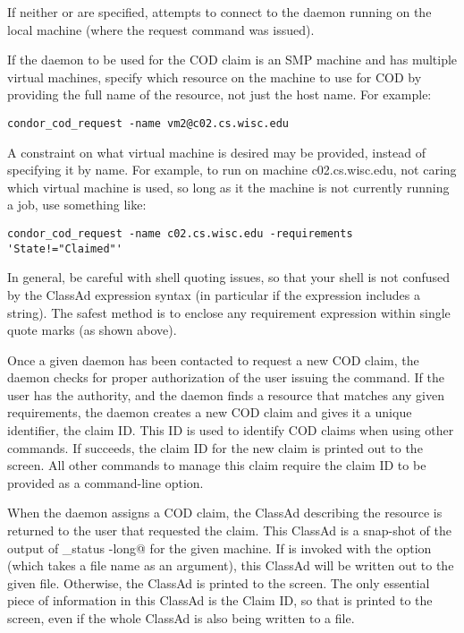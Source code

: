 If neither  or  are specified,
 attempts to connect to the 
daemon running
on the local machine (where the request command was issued).

If the  daemon to be used for the COD claim is an SMP
machine and has multiple virtual machines, specify which resource on
the machine to use for COD by providing the full name of the resource,
not just the host name.
For example:
\begin{verbatim}
condor_cod_request -name vm2@c02.cs.wisc.edu
\end{verbatim}

A constraint on what virtual machine is desired may be provided,
instead of specifying it by name.  
For example, to run on machine c02.cs.wisc.edu,
not caring which virtual machine is used,
so long as it the machine is not currently running a job,
use something like:
\begin{verbatim}
condor_cod_request -name c02.cs.wisc.edu -requirements 'State!="Claimed"'
\end{verbatim}

In general, be careful with shell quoting issues, so that
your shell is not confused by the ClassAd expression syntax (in
particular if the expression includes a string).
The safest method is to enclose any requirement expression
within single quote marks (as shown above).
 
Once a given  daemon has been contacted to request a new COD
claim, the  daemon checks for proper
authorization of the user
issuing the command.
If the user has the authority, and the  daemon
finds a
resource that matches any given requirements,
the  daemon
creates a new COD claim and gives it a unique identifier,
the claim ID.
This ID is used to identify COD claims when using other commands.
If  succeeds, the claim ID for the new claim is printed
out to the screen.
All other commands to manage this claim require the claim ID to be
provided as a command-line option.

When the  daemon assigns a COD claim,
the ClassAd describing the resource is returned to the user that
requested the claim. 
This ClassAd is a snap-shot of 
the output of \verb@condor_status -long@ for the given machine.
If  is invoked with the  option
(which takes a file name as an argument), this ClassAd will be written
out to the given file.
Otherwise, the ClassAd is printed to the screen.
The only essential piece of information in this ClassAd is the Claim
ID, so that is printed to the screen, even if the whole ClassAd is
also being written to a file.


